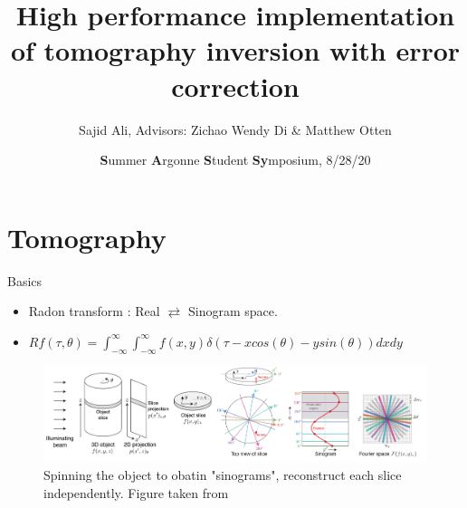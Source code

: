 \documentclass[aspectratio=43]{beamer}
\title{High performance implementation of tomography inversion with error correction}
\date[SASSy]{\textbf{S}ummer \textbf{A}rgonne \textbf{S}tudent \textbf{Sy}mposium, 8/28/20}
\author[Sajid]{Sajid Ali, Advisors: Zichao Wendy Di \& Matthew Otten}
\begin{document}
\begin{frame}
\titlepage
\end{frame}


\section{Tomography}
\begin{frame}{Basics}
	\begin{block}{}
    \begin{itemize}
    	\item Radon transform : Real $\rightleftarrows$ Sinogram space.
    	\item $Rf(\tau,\theta) = 
    	 \int_{-\infty}^{\infty}\int_{-\infty}^{\infty}
    	 f(x,y)\delta(\tau - x cos(\theta) - y sin(\theta))dxdy $
	\end{itemize}
    \end{block}
	\begin{center}
		\begin{figure}
			\includegraphics[scale=0.335]{figures/ppa_combined.png}
			\caption{Spinning the object to obatin "sinograms", reconstruct each slice independently. Figure taken from \cite{jacobsen_2019}}
		\end{figure}
	\end{center}
	
\end{frame}
\end{document}
